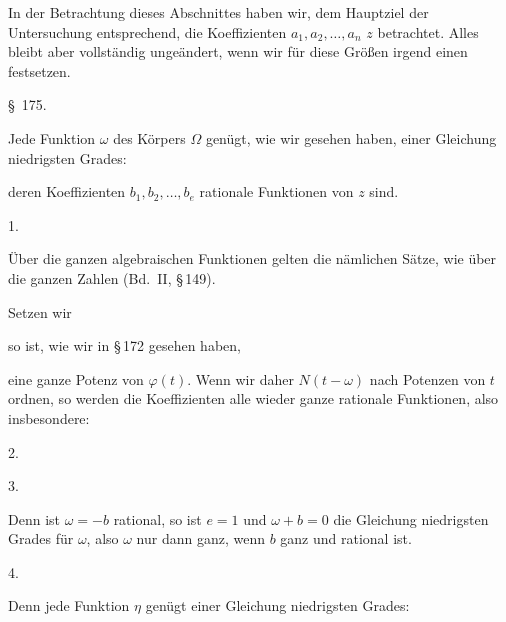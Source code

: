 
In der Betrachtung dieses Abschnittes haben wir, dem Hauptziel der Untersuchung
entsprechend, die Koeffizienten $a_1, a_2, \ldots, a_n$  $z$
betrachtet. Alles bleibt aber vollst\"andig unge\"andert, wenn wir f\"ur diese Gr\"o\ss{}en
irgend einen  festsetzen.

\begin{center}
\S\ 175. 
\end{center}

Jede Funktion $\omega$ des K\"orpers $\Omega$ gen\"ugt, wie wir gesehen haben, einer
Gleichung niedrigsten Grades:


deren Koeffizienten $b_1, b_2, \ldots, b_e$ rationale Funktionen von $z$ sind.

1.\ 

\"Uber die ganzen algebraischen Funktionen gelten die n\"amlichen S\"atze, wie \"uber die
ganzen Zahlen (Bd.\ II, \S\,149).

Setzen wir


so ist, wie wir in \S\,172 gesehen haben,


eine ganze Potenz von $\varphi(t)$. Wenn wir daher $N(t-\omega)$ nach Potenzen von $t$
ordnen, so werden die Koeffizienten alle wieder ganze rationale Funktionen, also
insbesondere:

2.\ 

3.\ 

Denn ist $\omega = -b$ rational, so ist $e = 1$ und $\omega + b = 0$ die Gleichung
niedrigsten Grades f\"ur $\omega$, also $\omega$ nur dann ganz, wenn $b$ ganz und rational
ist.

4.\ 

Denn jede Funktion $\eta$ gen\"ugt einer Gleichung niedrigsten Grades:

